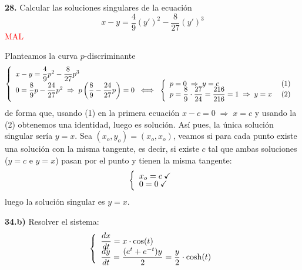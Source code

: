 \begin{ejer}
    \textbf{28.} Calcular las soluciones singulares de la ecuación
    $$x-y=\dfrac{4}{9} (y')^2 - \dfrac{8}{27}(y')^3$$
    \textcolor{red}{MAL}
\end{ejer}
\begin{sol}
Planteamos la curva $p$-discriminante
$$\left\{ \begin{array}{l}
     x-y=\dfrac{4}{9}p^2-\dfrac{8}{27}p^3  \\
     \vspace{-5mm} \\
      0=\dfrac{8}{9}p-\dfrac{24}{27}p^2 \; \Rightarrow \; p\left(\dfrac{8}{9}-\dfrac{24}{27}p\right)=0 \; \iff \; \left\{ \begin{array}{ll}
           p=0  \; \Rightarrow \; y=c & \; (1) \\
           \vspace{-5mm}\\ 
            p=\dfrac{8}{9} \cdot \dfrac{27}{24}=\dfrac{216}{216}=1 \; \Rightarrow \; y=x & \; (2)
      \end{array}\right.
\end{array} \right.$$
de forma que, usando (1) en la primera ecuación $x-c=0 \; \Rightarrow \; x=c$ y usando la (2) obtenemos una identidad, luego es solución. Así pues, la única solución singular sería $y=x$. Sea $(x_o,y_o)=(x_o,x_o)$, veamos si para cada punto existe una solución con la misma tangente, es decir, si existe $c$ tal que ambas soluciones ($y=c$ e $y=x$) pasan por el punto y tienen la misma tangente:
$$\left\{ \begin{array}{l}
        x_o=c \: \checkmark \\
        \vspace{-5mm} \\
        0=0 \: \checkmark
    \end{array} \right.$$
   luego la solución singular es $y=x$.
\end{sol}
\begin{ejer}
    \textbf{34.b)} Resolver el sistema:
    $$\left\{ \begin{array}{l}
          \dfrac{dx}{dt}=x \cdot \cos(t) \\
        \vspace{-5mm} \\
          \dfrac{dy}{dt}=\dfrac{(e^t+e^{-t})y}{2}=\dfrac{y}{2}\cdot \cosh(t)
    \end{array} \right.$$
\end{ejer}
